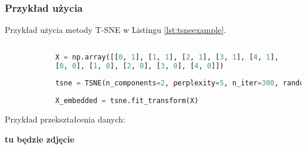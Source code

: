 			
		\subsubsection{Przykład użycia}
		
			Przykład użycia metody T-SNE w Listingu \ref{lst:tsneexample}.
		
			\begin{lstlisting}[language=Python, caption={Przykład użycia t-SNE do osadzania danych}, label={lst:tsneexample}]
	
			X = np.array([[0, 1], [1, 1], [2, 1], [3, 1], [4, 1],
			[0, 0], [1, 0], [2, 0], [3, 0], [4, 0]])
			
			tsne = TSNE(n_components=2, perplexity=5, n_iter=300, random_state=0)
			
			X_embedded = tsne.fit_transform(X)
			\end{lstlisting}
			
			
			Przykład przekształcenia danych:
			
				\textbf{tu będzie zdjęcie}
	
	






